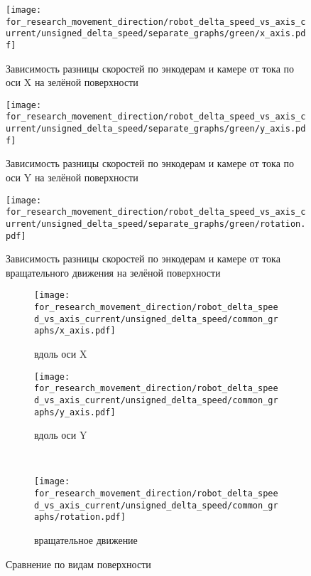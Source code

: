 \begin{figure}[H]
    \centering
    \texttt{[image: for\_research\_movement\_direction/robot\_delta\_speed\_vs\_axis\_current/unsigned\_delta\_speed/separate\_graphs/green/x\_axis.pdf]}
    \caption{Зависимость разницы скоростей по энкодерам и камере от тока по оси X на зелёной поверхности}
\end{figure}

\begin{figure}[H]
    \centering
    \texttt{[image: for\_research\_movement\_direction/robot\_delta\_speed\_vs\_axis\_current/unsigned\_delta\_speed/separate\_graphs/green/y\_axis.pdf]}
    \caption{Зависимость разницы скоростей по энкодерам и камере от тока по оси Y на зелёной поверхности}
\end{figure}

\begin{figure}[H]
    \centering
    \texttt{[image: for\_research\_movement\_direction/robot\_delta\_speed\_vs\_axis\_current/unsigned\_delta\_speed/separate\_graphs/green/rotation.pdf]}
    \caption{Зависимость разницы скоростей по энкодерам и камере от тока вращательного движения на зелёной поверхности}
\end{figure}

\begin{figure}[H]
    \centering
    \begin{subfigure}{0.49\textwidth}
        \centering
        \texttt{[image: for\_research\_movement\_direction/robot\_delta\_speed\_vs\_axis\_current/unsigned\_delta\_speed/common\_graphs/x\_axis.pdf]}
        \caption{вдоль оси X}
    \end{subfigure}
    \hspace{0.005\textwidth}
    \begin{subfigure}{0.49\textwidth}
        \centering
        \texttt{[image: for\_research\_movement\_direction/robot\_delta\_speed\_vs\_axis\_current/unsigned\_delta\_speed/common\_graphs/y\_axis.pdf]}
        \caption{вдоль оси Y}
    \end{subfigure} \\
    \vspace{4pt}
    \centering
    \begin{subfigure}{0.49\textwidth}
        \centering
        \texttt{[image: for\_research\_movement\_direction/robot\_delta\_speed\_vs\_axis\_current/unsigned\_delta\_speed/common\_graphs/rotation.pdf]}
        \caption{вращательное движение}
    \end{subfigure}
    \caption{Сравнение по видам поверхности}
\end{figure}

